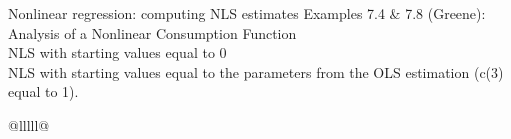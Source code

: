 \documentclass{beamer}
\begin{document}
\begin{frame}{Nonlinear regression: computing NLS estimates}
Examples 7.4 \& 7.8 (Greene):\\ Analysis of a Nonlinear Consumption Function\\
NLS with starting values equal to 0 \\NLS with starting values equal to the parameters from the OLS estimation (c(3) equal to 1).
\tiny
\begin{table}[]
\centering
\begin{tabular}{@{}lllll@{}}
\toprule
{} \\
                                                                                                                                                                                                                                                       \\
                                                                                                                                                                                                                                                       \\
                                                                                                                                                                                                                                                       \\
                                                                                                                                                                                                                                                       \\
                                                                                                                                                                                                                                                       \\ \midrule

\end{tabular}
\end{table}
\end{frame}
\end{document}
